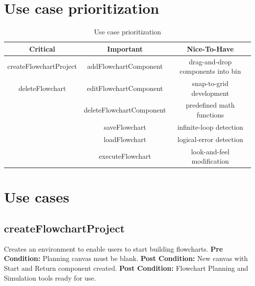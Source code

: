 \documentclass[12pt,a4paper,titlepage]{article}
\begin{document}
\newpage	
\section{Use case prioritization}


\begin{table}[h!]   
    \label{tab:table1}
    \begin{tabular}{ccc}
      \toprule
      Critical & Important & Nice-To-Have\\
      \midrule	
    
      createFlowchartProject & addFlowchartComponent &  drag-and-drop components into bin\\
      deleteFlowchart & editFlowchartComponent & snap-to-grid development\\
       & deleteFlowchartComponent & predefined math functions\\
       & saveFlowchart & infinite-loop detection\\
       & loadFlowchart & logical-error detection\\
       & executeFlowchart & look-and-feel modification\\
      \bottomrule     
     \end{tabular}  
    \caption{Use case prioritization}
\end{table}


\newpage
\section{Use cases}

\subsection{createFlowchartProject}
Creates an environment to enable users to start building flowcharts.\newline\newline
\textbf{Pre Condition:} Planning canvas must be blank.\newline\newline
\textbf{Post Condition:} New canvas with Start and Return component created.\newline
\textbf{Post Condition:} Flowchart Planning and Simulation tools ready for use.\newline
\end{document}
